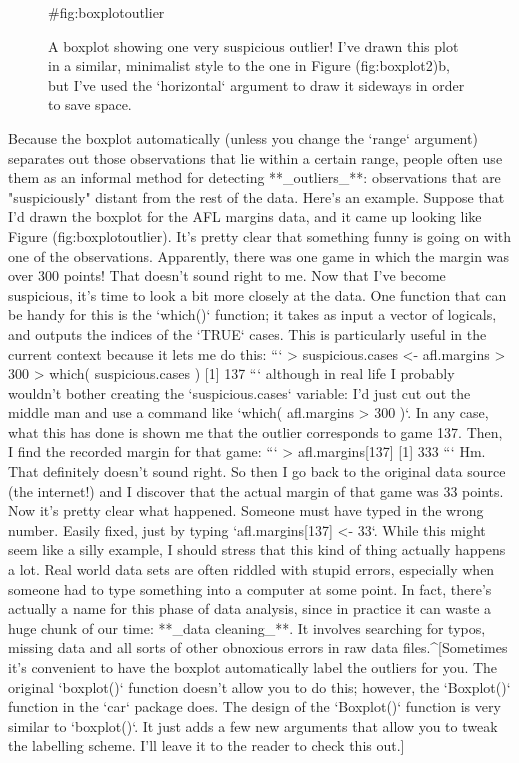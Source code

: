 \begin{figure}[t]
\begin{center}
\caption{A boxplot showing one very suspicious outlier! I've drawn this plot in a similar, minimalist style to the one in Figure \@ref(fig:boxplot2)b, but I've used the `horizontal` argument to draw it sideways in order to save space.}
{#fig:boxplotoutlier}
\HR
\end{center}
\end{figure}
Because the boxplot automatically (unless you change the `range` argument) separates out those observations that lie within a certain range, people often use them as an informal method for detecting **_outliers_**: observations that are "suspiciously" distant from the rest of the data. Here's an example. Suppose that I'd drawn the boxplot for the AFL margins data, and it came up looking like Figure \@ref(fig:boxplotoutlier). It's pretty clear that something funny is going on with one of the observations. Apparently, there was one game in which the margin was over 300 points! That doesn't sound right to me. Now that I've become suspicious, it's time to look a bit more closely at the data. One function that can be handy for this is the `which()` function; it takes as input a vector of logicals, and outputs the indices of the `TRUE` cases. This is particularly useful in the current context because it lets me do this:
```
> suspicious.cases <- afl.margins > 300
> which( suspicious.cases )
[1] 137
```
although in real life I probably wouldn't bother creating the `suspicious.cases` variable: I'd just cut out the middle man and use a command like `which( afl.margins > 300 )`. In any case, what this has done is shown me that the outlier corresponds to game 137. Then, I find the recorded margin for that game:
```
> afl.margins[137]
[1] 333
```
Hm. That definitely doesn't sound right. So then I go back to the original data source (the internet!) and I discover that the actual margin of that game was 33 points. Now it's pretty clear what happened. Someone must have typed in the wrong number. Easily fixed, just by typing `afl.margins[137] <- 33`.   While this might seem like a silly example, I should stress that this kind of thing actually happens a lot. Real world data sets are often riddled with stupid errors, especially when someone had to type something into a computer at some point. In fact, there's actually a name for this phase of data analysis, since in practice it can waste a huge chunk of our time: **_data cleaning_**. It involves searching for typos, missing data and all sorts of other obnoxious errors in raw data files.^[Sometimes it's convenient to have the boxplot automatically label the outliers for you. The original `boxplot()` function doesn't allow you to do this; however, the `Boxplot()` function in the `car` package does. The design of the `Boxplot()` function is very similar to `boxplot()`. It just adds a few new arguments that allow you to tweak the labelling scheme. I'll leave it to the reader to check this out.]  

